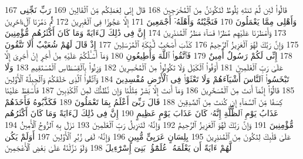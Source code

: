 {\tiny\colorbox{cl_aya}{167}} قَالُوا۟ لَئِن لَّمْ تَنتَهِ يَٰلُوطُ لَتَكُونَنَّ مِنَ ٱلْمُخْرَجِينَ
{\tiny\colorbox{cl_aya}{168}} قَالَ إِنِّى لِعَمَلِكُم مِّنَ ٱلْقَالِينَ
{\tiny\colorbox{cl_aya}{169}} رَبِّ نَجِّنِى وَأَهْلِى مِمَّا يَعْمَلُونَ
{\tiny\colorbox{cl_aya}{170}} فَنَجَّيْنَٰهُ وَأَهْلَهُۥٓ أَجْمَعِينَ
{\tiny\colorbox{cl_aya}{171}} إِلَّا عَجُوزًا فِى ٱلْغَٰبِرِينَ
{\tiny\colorbox{cl_aya}{172}} ثُمَّ دَمَّرْنَا ٱلْءَاخَرِينَ
{\tiny\colorbox{cl_aya}{173}} وَأَمْطَرْنَا عَلَيْهِم مَّطَرًا فَسَآءَ مَطَرُ ٱلْمُنذَرِينَ
{\tiny\colorbox{cl_aya}{174}} إِنَّ فِى ذَٰلِكَ لَءَايَةً وَمَا كَانَ أَكْثَرُهُم مُّؤْمِنِينَ
{\tiny\colorbox{cl_aya}{175}} وَإِنَّ رَبَّكَ لَهُوَ ٱلْعَزِيزُ ٱلرَّحِيمُ
{\tiny\colorbox{cl_aya}{176}} كَذَّبَ أَصْحَٰبُ لْـَٔيْكَةِ ٱلْمُرْسَلِينَ
{\tiny\colorbox{cl_aya}{177}} إِذْ قَالَ لَهُمْ شُعَيْبٌ أَلَا تَتَّقُونَ
{\tiny\colorbox{cl_aya}{178}} إِنِّى لَكُمْ رَسُولٌ أَمِينٌ
{\tiny\colorbox{cl_aya}{179}} فَٱتَّقُوا۟ ٱللَّهَ وَأَطِيعُونِ
{\tiny\colorbox{cl_aya}{180}} وَمَآ أَسْـَٔلُكُمْ عَلَيْهِ مِنْ أَجْرٍ إِنْ أَجْرِىَ إِلَّا عَلَىٰ رَبِّ ٱلْعَٰلَمِينَ
{\tiny\colorbox{cl_aya}{181}} أَوْفُوا۟ ٱلْكَيْلَ وَلَا تَكُونُوا۟ مِنَ ٱلْمُخْسِرِينَ
{\tiny\colorbox{cl_aya}{182}} وَزِنُوا۟ بِٱلْقِسْطَاسِ ٱلْمُسْتَقِيمِ
{\tiny\colorbox{cl_aya}{183}} وَلَا تَبْخَسُوا۟ ٱلنَّاسَ أَشْيَآءَهُمْ وَلَا تَعْثَوْا۟ فِى ٱلْأَرْضِ مُفْسِدِينَ
{\tiny\colorbox{cl_aya}{184}} وَٱتَّقُوا۟ ٱلَّذِى خَلَقَكُمْ وَٱلْجِبِلَّةَ ٱلْأَوَّلِينَ
{\tiny\colorbox{cl_aya}{185}} قَالُوٓا۟ إِنَّمَآ أَنتَ مِنَ ٱلْمُسَحَّرِينَ
{\tiny\colorbox{cl_aya}{186}} وَمَآ أَنتَ إِلَّا بَشَرٌ مِّثْلُنَا وَإِن نَّظُنُّكَ لَمِنَ ٱلْكَٰذِبِينَ
{\tiny\colorbox{cl_aya}{187}} فَأَسْقِطْ عَلَيْنَا كِسَفًا مِّنَ ٱلسَّمَآءِ إِن كُنتَ مِنَ ٱلصَّٰدِقِينَ
{\tiny\colorbox{cl_aya}{188}} قَالَ رَبِّىٓ أَعْلَمُ بِمَا تَعْمَلُونَ
{\tiny\colorbox{cl_aya}{189}} فَكَذَّبُوهُ فَأَخَذَهُمْ عَذَابُ يَوْمِ ٱلظُّلَّةِ إِنَّهُۥ كَانَ عَذَابَ يَوْمٍ عَظِيمٍ
{\tiny\colorbox{cl_aya}{190}} إِنَّ فِى ذَٰلِكَ لَءَايَةً وَمَا كَانَ أَكْثَرُهُم مُّؤْمِنِينَ
{\tiny\colorbox{cl_aya}{191}} وَإِنَّ رَبَّكَ لَهُوَ ٱلْعَزِيزُ ٱلرَّحِيمُ
{\tiny\colorbox{cl_aya}{192}} وَإِنَّهُۥ لَتَنزِيلُ رَبِّ ٱلْعَٰلَمِينَ
{\tiny\colorbox{cl_aya}{193}} نَزَلَ بِهِ ٱلرُّوحُ ٱلْأَمِينُ
{\tiny\colorbox{cl_aya}{194}} عَلَىٰ قَلْبِكَ لِتَكُونَ مِنَ ٱلْمُنذِرِينَ
{\tiny\colorbox{cl_aya}{195}} بِلِسَانٍ عَرَبِىٍّ مُّبِينٍ
{\tiny\colorbox{cl_aya}{196}} وَإِنَّهُۥ لَفِى زُبُرِ ٱلْأَوَّلِينَ
{\tiny\colorbox{cl_aya}{197}} أَوَلَمْ يَكُن لَّهُمْ ءَايَةً أَن يَعْلَمَهُۥ عُلَمَٰٓؤُا۟ بَنِىٓ إِسْرَٰٓءِيلَ
{\tiny\colorbox{cl_aya}{198}} وَلَوْ نَزَّلْنَٰهُ عَلَىٰ بَعْضِ ٱلْأَعْجَمِينَ

